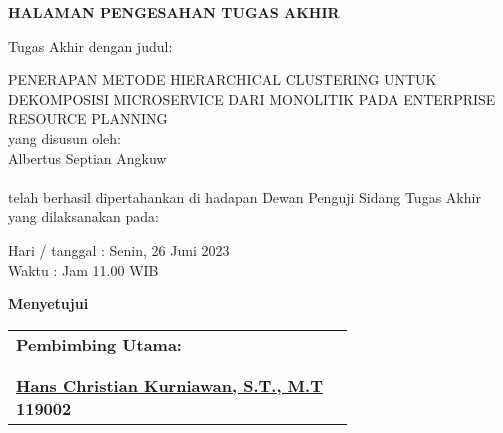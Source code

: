 \vspace*{0cm}

\begin{center}		
	{\large \bfseries HALAMAN PENGESAHAN TUGAS AKHIR \\}
\end{center}
		
\vspace{2cm}

\noindent Tugas Akhir dengan judul:

\noindent PENERAPAN METODE HIERARCHICAL CLUSTERING UNTUK DEKOMPOSISI MICROSERVICE DARI MONOLITIK PADA ENTERPRISE RESOURCE PLANNING\\

\noindent yang disusun oleh: \\
\noindent Albertus Septian Angkuw \\
 \\

\noindent telah berhasil dipertahankan di hadapan Dewan Penguji Sidang Tugas Akhir yang dilaksanakan pada: 

\begin{tabs}{3cm}
	\noindent Hari / tanggal \tab : Senin, 26 Juni 2023 \\
	\noindent Waktu \tab : Jam 11.00 WIB
\end{tabs}

\vspace{3.2cm}
\begin{center}	
\textbf{Menyetujui} \\
\end{center}

\begin{longtable}{p{6.5cm} p{6.5cm}}
	\centering \textbf{Pembimbing Utama:}  \\
	
	\cr \\ \\
		
	\centering \textbf{ \underline{Hans Christian Kurniawan, S.T., M.T} \\ 119002} \\
	
\end{longtable}